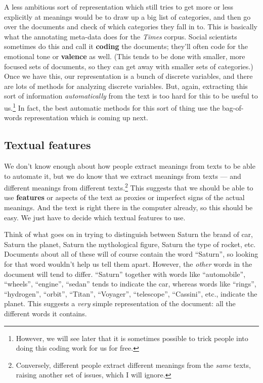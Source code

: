 \documentclass{article}
\begin{document}
A less ambitious sort of representation which still tries to get more or less
explicitly at meanings would be to draw up a big list of categories, and then
go over the documents and check of which categories they fall in to.  This is
basically what the annotating meta-data does for the {\em Times} corpus.
Social scientists sometimes do this and call it {\bf coding} the documents;
they'll often code for the emotional tone or {\bf valence} as well.  (This
tends to be done with smaller, more focused sets of documents, so they can get
away with smaller sets of categories.)  Once we have this, our representation
is a bunch of discrete variables, and there are lots of methods for analyzing
discrete variables.  But, again, extracting this sort of information {\em
  automatically} from the text is too hard for this to be useful to
us.\footnote{However, we will see later that it is sometimes possible to trick
  people into doing this coding work for us for free.}  In fact, the best
automatic methods for this sort of thing use the bag-of-words representation
which is coming up next.

\subsection{Textual features}

We don't know enough about how people extract meanings from texts to be able to
automate it, but we do know that we extract meanings from texts --- and
different meanings from different texts.\footnote{Conversely, different people
  extract different meanings from the {\em same} texts, raising another set of
  issues, which I will ignore.} This suggests that we should be able to use
{\bf features} or aspects of the text as proxies or imperfect signs of the
actual meanings.  And the text is right there in the computer already, so this
should be easy.  We just have to decide which textual features to use.

Think of what goes on in trying to distinguish between Saturn the brand of car,
Saturn the planet, Saturn the mythological figure, Saturn the type of rocket,
etc.  Documents about all of these will of course contain the word ``Saturn'',
so looking for that word wouldn't help us tell them apart.  However, the {\em
  other} words in the document will tend to differ.  ``Saturn'' together with
words like ``automobile'', ``wheels'', ``engine'', ``sedan'' tends to indicate
the car, whereas words like ``rings'', ``hydrogen'', ``orbit'', ``Titan'',
``Voyager'', ``telescope'', ``Cassini'', etc., indicate the planet.  This
suggests a {\em very} simple representation of the document: all the different
words it contains.
\end{document}

